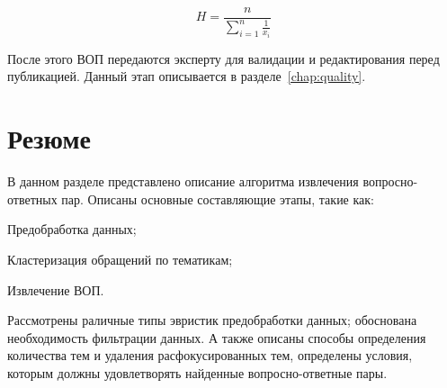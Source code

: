 \begin{equation}\label{eq:harm}
H = \frac{n}{\sum_{i=1}^n\frac{1}{x_i}}
\end{equation}

После этого ВОП передаются эксперту для валидации и редактирования перед публикацией.  Данный этап описывается в разделе~\ref{chap:quality}.

\section{Резюме}
\label{sec:dev_concl}

В данном разделе представлено описание алгоритма извлечения вопросно-ответных пар. Описаны основные составляющие этапы, такие как:

\begin{itemize*}
\item Предобработка данных;
\item Кластеризация обращений по тематикам;
\item Извлечение ВОП.
\end{itemize*}

Рассмотрены раличные типы эвристик предобработки данных; обоснована необходимость фильтрации данных. А также описаны способы определения количества тем и удаления расфокусированных тем, определены условия, которым должны удовлетворять найденные вопросно-ответные пары.